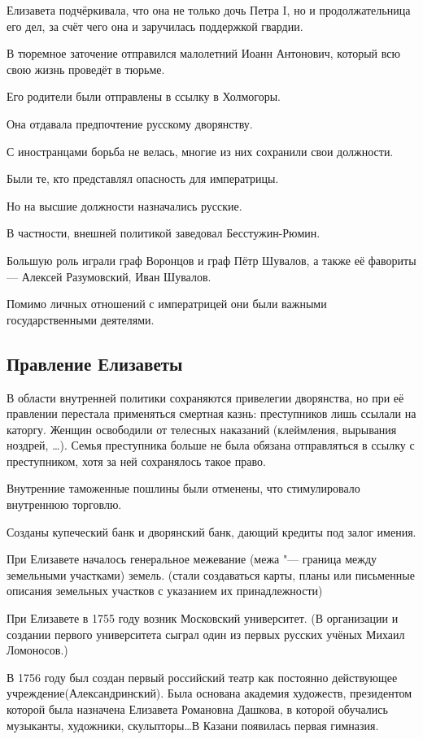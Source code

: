 Елизавета подчёркивала, что она не только дочь Петра I, но и продолжательница его дел, за счёт чего она и заручилась поддержкой гвардии.

В тюремное заточение отправился малолетний Иоанн Антонович, который всю свою жизнь проведёт в тюрьме. 

Его родители были отправлены в ссылку в Холмогоры.

Она отдавала предпочтение русскому дворянству. 

С иностранцами борьба не велась, многие из них сохранили свои должности. 

Были те, кто представлял опасность для императрицы. 

Но на высшие должности назначались русские. 

В частности, внешней политикой заведовал Бесстужин-Рюмин. 

Большую роль играли граф Воронцов и граф Пётр Шувалов, а также её фавориты — Алексей Разумовский, Иван Шувалов. 

Помимо личных отношений с императрицей они были важными государственными деятелями.

\subsection{Правление Елизаветы}

В области внутренней политики сохраняются привелегии дворянства, но при её правлении перестала применяться смертная казнь: преступников лишь ссылали на каторгу. Женщин освободили от телесных наказаний (клеймления, вырывания ноздрей, \ldots).  Семья преступника больше не была обязана отправляться в ссылку с преступником, хотя за ней сохранялось такое право. 

Внутренние таможенные пошлины были отменены, что стимулировало внутреннюю торговлю. 

Созданы купеческий банк и дворянский банк, дающий кредиты под залог имения.

При Елизавете началось генеральное межевание (межа "--- граница между земельными участками) земель. (стали создаваться карты, планы или письменные описания земельных участков с указанием их принадлежности)

При Елизавете в 1755 году возник Московский университет. (В организации и создании первого университета сыграл один из первых русских учёных Михаил Ломоносов.)

В 1756 году был создан первый российский театр как постоянно действующее учреждение(Александринский). Была основана академия художеств, президентом которой была назначена Елизавета Романовна Дашкова, в которой обучались музыканты, художники, скульпторы\ldots В Казани появилась первая гимназия.

